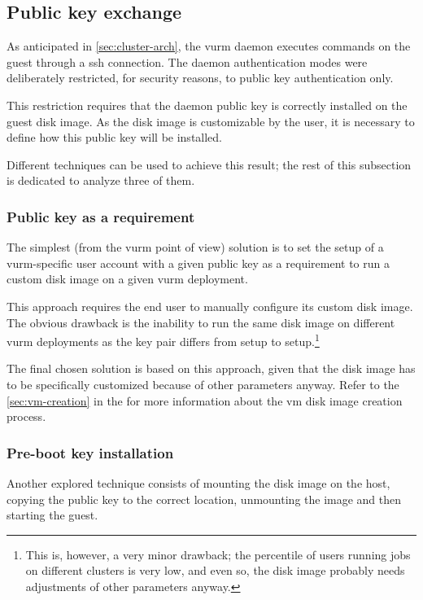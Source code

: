 \subsection{Public key exchange}
\label{sec:pk-exchange}

As anticipated in \autoref{sec:cluster-arch}, the \gls{vurm} daemon executes commands on the guest through a \gls{ssh} connection. The daemon authentication modes were deliberately restricted, for security reasons, to public key authentication only.

This restriction requires that the daemon public key is correctly installed on the guest disk image. As the disk image is customizable by the user, it is necessary to define how this public key will be installed.

Different techniques can be used to achieve this result; the rest of this subsection is dedicated to analyze three of them.

\subsubsection{Public key as a requirement}

The simplest (from the \gls{vurm} point of view) solution is to set the setup of a \gls{vurm}-specific user account with a given public key as a requirement to run a custom disk image on a given \gls{vurm} deployment.

This approach requires the end user to manually configure its custom disk image. The obvious drawback is the inability to run the same disk image on different \gls{vurm} deployments as the key pair differs from setup to setup.\footnote{This is, however, a very minor drawback; the percentile of users running jobs on different clusters is very low, and even so, the disk image probably needs adjustments of other parameters anyway.}

The final chosen solution is based on this approach, given that the disk image has to be specifically customized because of other parameters anyway. Refer to the \autoref{sec:vm-creation} in the \emph{} for more information about the \gls{vm} disk image creation process.

\subsubsection{Pre-boot key installation}

Another explored technique consists of mounting the disk image on the host, copying the public key to the correct location, unmounting the image and then starting the guest.

